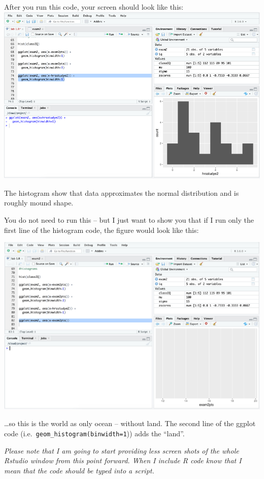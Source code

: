 \documentclass[
]{book}
\begin{document}
After you run this code, your screen should look like this:\\
\includegraphics{img/tidyhist3.png}

The histogram show that data approximates the normal distribution and is roughly mound shape.

You do not need to run this -- but I just want to show you that if I run only the first line of the histogram code, the figure would look like this:

\includegraphics{img/ggoc.png}

\ldots so this is the world as only ocean -- without land. The second line of the ggplot code (i.e.~\texttt{geom\_histogram(binwidth=1})) adds the ``land''.

\emph{Please note that I am going to start providing less screen shots of the whole Rstudio window from this point forward. When I include R code know that I mean that the code should be typed into a script.}
\end{document}
